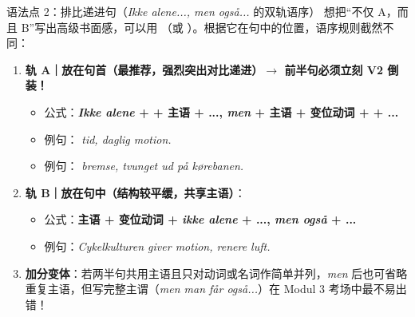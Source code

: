 \begin{grammatikbox}{语法点 2：排比递进句（\textit{Ikke alene..., men også...} 的双轨语序）}
想把“不仅 A，而且 B”写出高级书面感，可以用 （或 ）。根据它在句中的位置，语序规则截然不同：
\begin{enumerate}
  \item \textbf{轨 A｜放在句首（最推荐，强烈突出对比递进）$\rightarrow$ 前半句必须立刻 V2 倒装！}
    \begin{itemize}
      \item 公式：\textbf{\textit{Ikke alene} +  + 主语 + ..., \textit{men} + 主语 + 变位动词 +  + ...}
      \item 例句：\textit{ tid,  daglig motion.}
      \item 例句：\textit{ bremse,  tvunget ud på kørebanen.}
    \end{itemize}
  \item \textbf{轨 B｜放在句中（结构较平缓，共享主语）}：
    \begin{itemize}
      \item 公式：\textbf{主语 + 变位动词 + \textit{ikke alene} + ..., \textit{men også} + ...}
      \item 例句：\textit{Cykelkulturen giver  motion,  renere luft.}
    \end{itemize}
  \item \textbf{加分变体}：若两半句共用主语且只对动词或名词作简单并列，\textit{men} 后也可省略重复主语，但写完整主谓（\textit{men man får også...}）在 Modul 3 考场中最不易出错！
\end{enumerate}
\end{grammatikbox}

